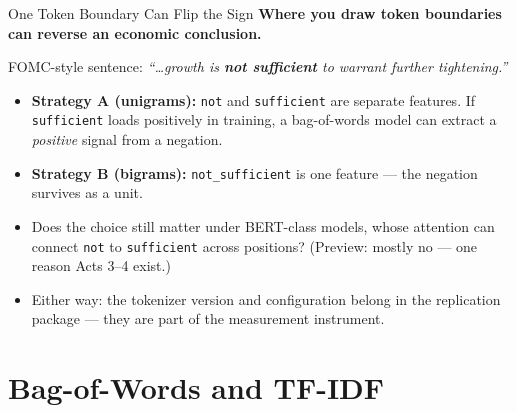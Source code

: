 \begin{frame}{One Token Boundary Can Flip the Sign}
\textbf{Where you draw token boundaries can reverse an economic conclusion.}
\begin{cautionbox}
FOMC-style sentence: \emph{``\ldots growth is \textbf{not sufficient} to warrant further tightening.''}
\begin{itemize}
\item \textbf{Strategy A (unigrams):} \texttt{not} and \texttt{sufficient} are separate features. If \texttt{sufficient} loads positively in training, a bag-of-words model can extract a \emph{positive} signal from a negation.
\item \textbf{Strategy B (bigrams):} \texttt{not\_sufficient} is one feature --- the negation survives as a unit.
\end{itemize}
\end{cautionbox}
\medskip
\begin{itemize}
\item Does the choice still matter under BERT-class models, whose attention can connect \texttt{not} to \texttt{sufficient} across positions? (Preview: mostly no --- one reason Acts 3--4 exist.)
\item Either way: the tokenizer version and configuration belong in the replication package --- they are part of the measurement instrument.
\end{itemize}
\end{frame}

\section{Bag-of-Words and TF-IDF}

